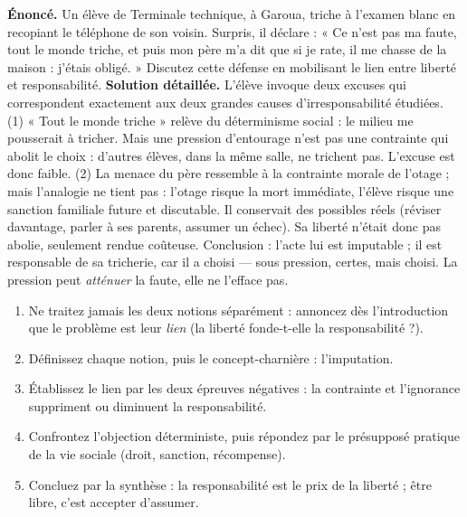 \documentclass[11pt]{article}
\newcommand{\cle}[1]{{\popxbold\color{popdark}#1}}
\begin{document}
\begin{exoresolu}
\textbf{Énoncé.} Un élève de Terminale technique, à Garoua, triche à l'examen blanc en recopiant le téléphone de son voisin. Surpris, il déclare : « Ce n'est pas ma faute, tout le monde triche, et puis mon père m'a dit que si je rate, il me chasse de la maison : j'étais obligé. » Discutez cette défense en mobilisant le lien entre liberté et responsabilité.
\tcblower
\textbf{Solution détaillée.} L'élève invoque deux excuses qui correspondent exactement aux deux grandes causes d'irresponsabilité étudiées. (1) « Tout le monde triche » relève du déterminisme social : le milieu me pousserait à tricher. Mais une pression d'entourage n'est pas une contrainte qui abolit le choix : d'autres élèves, dans la même salle, ne trichent pas. L'excuse est donc faible. (2) La menace du père ressemble à la contrainte morale de l'otage ; mais l'analogie ne tient pas : l'otage risque la mort immédiate, l'élève risque une sanction familiale future et discutable. Il conservait des possibles réels (réviser davantage, parler à ses parents, assumer un échec). Sa liberté n'était donc pas abolie, seulement rendue coûteuse. Conclusion : l'acte lui est imputable ; il est responsable de sa tricherie, car il a choisi — sous pression, certes, mais choisi. La pression peut \emph{atténuer} la faute, elle ne l'efface pas.
\end{exoresolu}

\begin{methode}
\begin{enumerate}
\item Ne traitez jamais les deux notions séparément : annoncez dès l'introduction que le problème est leur \emph{lien} (la liberté fonde-t-elle la responsabilité ?).
\item Définissez chaque notion, puis le concept-charnière : l'\cle{imputation}.
\item Établissez le lien par les deux épreuves négatives : la contrainte et l'ignorance suppriment ou diminuent la responsabilité.
\item Confrontez l'objection déterministe, puis répondez par le présupposé pratique de la vie sociale (droit, sanction, récompense).
\item Concluez par la synthèse : la responsabilité est le prix de la liberté ; être libre, c'est accepter d'assumer.
\end{enumerate}
\end{methode}
\end{document}
